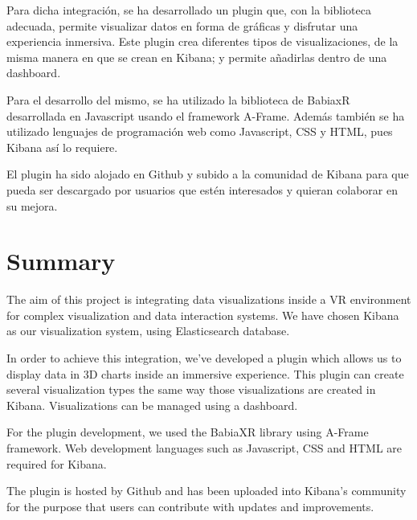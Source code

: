 \documentclass[a4paper, 12pt]{book}
\begin{document}
Para dicha integración, se ha desarrollado un plugin que, con la biblioteca adecuada, permite visualizar datos en forma de gráficas y disfrutar una experiencia inmersiva. Este plugin crea diferentes tipos de visualizaciones, de la misma manera en que se crean en Kibana; y permite añadirlas dentro de una dashboard.

Para el desarrollo del mismo, se ha utilizado la biblioteca de BabiaxR desarrollada en Javascript usando el framework A-Frame. Además también se ha utilizado lenguajes de programación web como Javascript, CSS y HTML, pues Kibana así lo requiere.

El plugin ha sido alojado en Github y subido a la comunidad de Kibana para que pueda ser descargado por usuarios que estén interesados y quieran colaborar en su mejora.



\chapter*{Summary}

The aim of this project is integrating data visualizations inside a VR environment for complex visualization and data interaction systems. We have chosen Kibana as our visualization system, using Elasticsearch database.

In order to achieve this integration, we’ve developed a plugin which allows us to display data in 3D charts inside an immersive experience. This plugin can create several visualization types the same way those visualizations are created in Kibana. Visualizations can be managed using a dashboard.

For the plugin development, we used the BabiaXR library using A-Frame framework. Web development languages such as Javascript, CSS and HTML are required for Kibana.

The plugin is hosted by Github and has been uploaded into Kibana’s community for the purpose that users can contribute with updates and improvements.




\tableofcontents
\cleardoublepage
\listoffigures %
\end{document}
